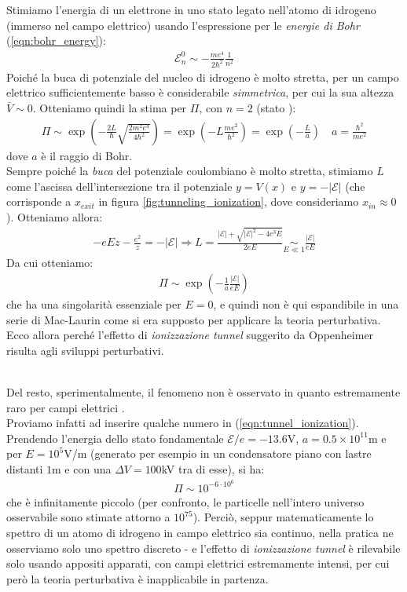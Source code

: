 \documentclass[../../FisicaTeorica.tex]{subfiles}
\begin{document}
Stimiamo l'energia di un elettrone in uno stato legato nell'atomo di idrogeno (immerso nel campo elettrico) usando l'espressione per le \textit{energie di Bohr} (\ref{eqn:bohr_energy}):
\begin{align*}
\mathcal{E}_n^0 \sim -\frac{me^4}{2\hbar^2}\frac{1}{n^2}
\end{align*}
Poiché la buca di potenziale del nucleo di idrogeno è molto stretta, per un campo elettrico sufficientemente basso è considerabile \textit{simmetrica}, per cui la sua altezza $\bar{V} \sim 0$. Otteniamo quindi la stima per $\Pi$, con $n=2$ (stato ):
\begin{align*}
\Pi \sim \exp\left(-\frac{2L}{\hbar}\sqrt{\frac{2m^2 e^4}{4\hbar^2}}\right)= \exp\left(-L \frac{me^2}{\hbar^2}\right)=\exp\left(-\frac{L}{a}\right) \quad a = \frac{\hbar^2}{me^2}
\end{align*}
dove $a$ è il raggio di Bohr.\\
Sempre poiché la \textit{buca} del potenziale coulombiano è molto stretta, stimiamo $L$ come l'ascissa dell'intersezione tra il potenziale $y=V(x)$ e $y=-|\mathcal{E}|$ (che corrisponde a $x_{exit}$ in figura \ref{fig:tunneling_ionization}, dove consideriamo $x_{in}\approx 0$). Otteniamo allora:
\begin{align*}
-eEz  - \frac{e^2}{z} = -|\mathcal{E}| \Rightarrow  L = \frac{|\mathcal{E}| + \sqrt{|\mathcal{E}|^2 - 4e^3 E}}{2eE} \underset{E\ll1}{\sim} \frac{|\mathcal{E}|}{eE}
\end{align*}
Da cui otteniamo:
\begin{align}
\Pi \sim \exp \left(-\frac{1}{a}\frac{|\mathcal{E}|}{eE}\right)
\label{eqn:tunnel_ionization}
\end{align}
che ha una singolarità essenziale per $E=0$, e quindi non è qui espandibile in una serie di Mac-Laurin come si era supposto per applicare la teoria perturbativa. Ecco allora perché l'effetto di \textit{ionizzazione tunnel} suggerito da Oppenheimer risulta  agli sviluppi perturbativi.\\\

Del resto, sperimentalmente, il fenomeno non è osservato in quanto estremamente raro per campi elettrici .\\
Proviamo infatti ad inserire qualche numero in (\ref{eqn:tunnel_ionization}). Prendendo l'energia dello stato fondamentale $\mathcal{E}/e=-13.6$V, $a=0.5\times 10^{11}$m e per $E = 10^5$V/m (generato per esempio in un condensatore piano con lastre distanti $1$m e con una $\Delta V=100$kV tra di esse), si ha:
\begin{align*}
\Pi \sim 10^{-6\cdot 10^6 }
\end{align*}
che è infinitamente piccolo (per confronto, le particelle nell'intero universo osservabile sono stimate attorno a $10^{75}$). Perciò, seppur matematicamente lo spettro di un atomo di idrogeno in campo elettrico sia continuo, nella pratica ne osserviamo solo uno spettro discreto - e l'effetto di \textit{ionizzazione tunnel} è rilevabile solo usando appositi apparati, con campi elettrici estremamente intensi, per cui però la teoria perturbativa è inapplicabile in partenza.
\end{document}
